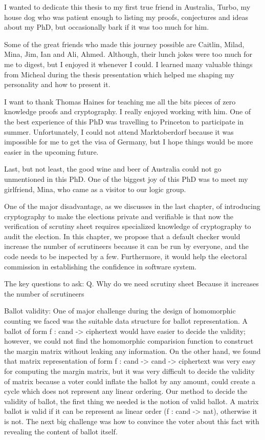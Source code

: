  I wanted to dedicate this thesis to my first true friend in Australia, Turbo, my house dog who was patient enough to 
 listing my proofs, conjectures and ideas about my PhD, but occasionally  bark if it was too much for him. 
 
 Some of the great friends who made this journey possible are Caitlin, Milad, Mina, Jim, Ian and Ali, Ahmed. Although, 
 their lunch jokes were too much for me to digest, but I enjoyed it whenever I could.  I learned many valuable things 
 from Micheal during the thesis presentation which helped me shaping my personality and how to present it. 
 
 I want to thank Thomas Haines for teaching me all the bits pieces of zero knowledge proofs and cryptography. I really 
 enjoyed working with him. One of the best experience of this PhD was travelling to Princeton to participate in summer. 
 Unfortunately, I could not attend Marktoberdorf because it was impossible for me to get the visa of Germany, but I hope
 things would be more easier in the upcoming future. 

Last, but not least, the good wine and beer of Australia could not go unmentioned in this PhD. 
One of the biggest joy of this PhD was to meet my girlfriend, Mina, who came as a visitor to our logic group. 

One of the major disadvantage, as we discusses in the last chapter, of introducing cryptography to make the elections 
private and verifiable is that now the verification of scrutiny sheet requires specialized knowledge of cryptography
to audit the election.  In this chapter, we propose that a default checker would increase the number of scrutineers 
because it can be run by everyone, and the code needs to be inspected by a few. Furthermore, it would help the 
electoral commission in establishing  the confidence in software system.  





The key questions to ask: 
Q. Why do we need scrutiny sheet
Because it increases the number of scrutineers 


Ballot validity: 
One of major challenge during the design of homomorphic counting we faced was the suitable data structure for
ballot representation. A ballot of form f : cand -> ciphertext would have easier to decide the validity; however, 
we could not find the homomorphic comparision function to construct the margin matrix without leaking 
any information. On the other hand, we found that matrix representation of form f : cand -> cand -> ciphertext 
was very easy for computing the margin matrix, but it was very difficult to decide the validity of matrix because 
a voter could inflate the ballot by any amount, could create a cycle which does not represent any linear 
ordering. Our method to decide the validity of ballot, the first thing we needed is the notion of valid ballot. 
A matrix ballot is valid if it can be represent as linear order (f : cand -> nat), otherwise it is not. The next 
big challenge was how to convince the voter about this fact with revealing the content of ballot itself. 


